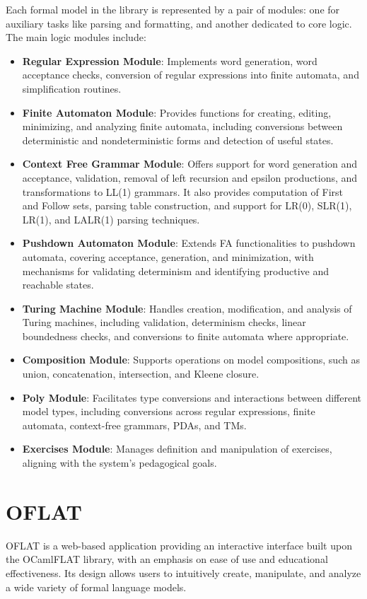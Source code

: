 Each formal model in the library is represented by a pair of modules: one for auxiliary tasks like parsing and formatting, and another dedicated to core logic. The main logic modules include:
\begin{itemize}
\item \textbf{Regular Expression Module}: Implements word generation, word acceptance checks, conversion of regular expressions into finite automata, and simplification routines.
\item \textbf{Finite Automaton Module}: Provides functions for creating, editing, minimizing, and analyzing finite automata, including conversions between deterministic and nondeterministic forms and detection of useful states.
\item \textbf{Context Free Grammar Module}: Offers support for word generation and acceptance, validation, removal of left recursion and epsilon productions, and transformations to LL(1) grammars. It also provides computation of First and Follow sets, parsing table construction, and support for LR(0), SLR(1), LR(1), and LALR(1) parsing techniques.
\item \textbf{Pushdown Automaton Module}: Extends FA functionalities to pushdown automata, covering acceptance, generation, and minimization, with mechanisms for validating determinism and identifying productive and reachable states.
\item \textbf{Turing Machine Module}: Handles creation, modification, and analysis of Turing machines, including validation, determinism checks, linear boundedness checks, and conversions to finite automata where appropriate.
\item \textbf{Composition Module}: Supports operations on model compositions, such as union, concatenation, intersection, and Kleene closure.
\item \textbf{Poly Module}: Facilitates type conversions and interactions between different model types, including conversions across regular expressions, finite automata, context-free grammars, PDAs, and TMs.
\item \textbf{Exercises Module}: Manages definition and manipulation of exercises, aligning with the system's pedagogical goals.
\end{itemize}

\section{OFLAT}

OFLAT is a web-based application providing an interactive interface built upon the OCamlFLAT library, 
with an emphasis on ease of use and educational effectiveness. Its design allows users to intuitively create, manipulate, and analyze a wide variety of formal language models.

